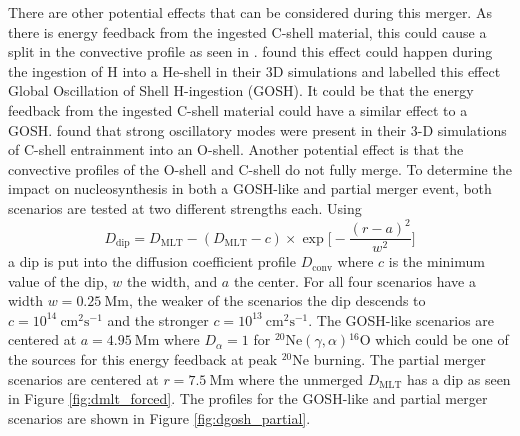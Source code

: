 There are other potential effects that can be considered during this merger.
As there is energy feedback from the ingested C-shell material, this could cause a split in the convective profile as seen in \cite{herwigCONVECTIVEREACTIVEPROTON2011}.
\cite{herwigGLOBALNONSPHERICALOSCILLATIONS2014} found this effect could happen during the ingestion of H into a He-shell in their 3D simulations and labelled this effect Global Oscillation of Shell H-ingestion (GOSH).
It could be that the energy feedback from the ingested C-shell material could have a similar effect to a GOSH.
\cite{andrassy3DHydrodynamicSimulations2020} found that strong oscillatory modes were present in their 3-D simulations of C-shell entrainment into an O-shell.
Another potential effect is that the convective profiles of the O-shell and C-shell do not fully merge. 
To determine the impact on nucleosynthesis in both a GOSH-like and partial merger event, both scenarios are tested at two different strengths each.
Using
\begin{equation}
D_{\mathrm{dip}}=D_{\mathrm{MLT}}-(D_{\mathrm{MLT}}-c)\times\exp\Biggl[-\frac{(r-a)^2}{w^2}\Biggr]
\end{equation}
a dip is put into the diffusion coefficient profile $D_{\mathrm{conv}}$ where $c$ is the minimum value of the dip, $w$ the width, and $a$ the center. 
For all four scenarios have a width $w=0.25~\mathrm{Mm}$, the weaker of the scenarios the dip descends to $c=10^{14}~\mathrm{cm^2s^{-1}}$ and the stronger $c=10^{13}~\mathrm{cm^2s^{-1}}$.
The GOSH-like scenarios are centered at $a=4.95~\mathrm{Mm}$ where $D_\alpha=1$ for $^{20}\mathrm{Ne}(\gamma,\alpha)$$^{16}\mathrm{O}$ which could be one of the sources for this energy feedback at peak $^{20}\mathrm{Ne}$ burning.
The partial merger scenarios are centered at $r=7.5\mathrm{~Mm}$ where the unmerged $D_{\mathrm{MLT}}$ has a dip as seen in Figure \ref{fig:dmlt_forced}. 
The profiles for the GOSH-like and partial merger scenarios are shown in Figure \ref{fig:dgosh_partial}.

